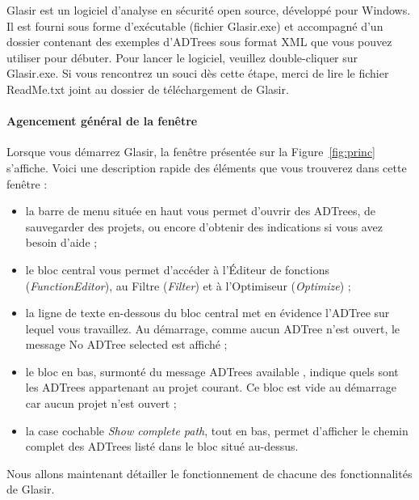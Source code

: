 Glasir est un logiciel d'analyse en sécurité open source, développé pour Windows. Il est fourni sous forme d'exécutable (fichier Glasir.exe) et accompagné d'un dossier contenant des exemples d'ADTrees sous format XML que vous pouvez utiliser pour débuter. Pour lancer le logiciel, veuillez double-cliquer sur Glasir.exe. Si vous rencontrez un souci dès cette étape, merci de lire le fichier ReadMe.txt joint au dossier de téléchargement de Glasir.

\paragraph{Agencement général de la fenêtre}
Lorsque vous démarrez Glasir, la fenêtre présentée sur la {\sc Figure}~\ref{fig:princ} s'affiche. Voici une description rapide des éléments que vous trouverez dans cette fenêtre :
\begin{itemize}
	\item  la barre de menu située en haut vous permet d'ouvrir des ADTrees, de sauvegarder des projets, ou encore d'obtenir des indications si vous avez besoin d'aide ;
	\item le bloc central vous permet d'accéder à l'Éditeur de fonctions (\emph{FunctionEditor}), au Filtre (\emph{Filter}) et à l'Optimiseur (\emph{Optimize}) ;
	\item la ligne de texte en-dessous du bloc central met en évidence l'ADTree sur lequel vous travaillez. Au démarrage, comme aucun ADTree n'est ouvert, le message \og No ADTree selected \fg{} est affiché ;
	\item le bloc en bas, surmonté du message \og ADTrees available \fg{}, indique quels sont les ADTrees appartenant au projet courant. Ce bloc est vide au démarrage car aucun projet n'est ouvert ;
	\item la case cochable \emph{Show complete path}, tout en bas, permet d'afficher le chemin complet des ADTrees listé dans le bloc situé au-dessus.
	\end{itemize}
	
	Nous allons maintenant détailler le fonctionnement de chacune des fonctionnalités de Glasir.
	
